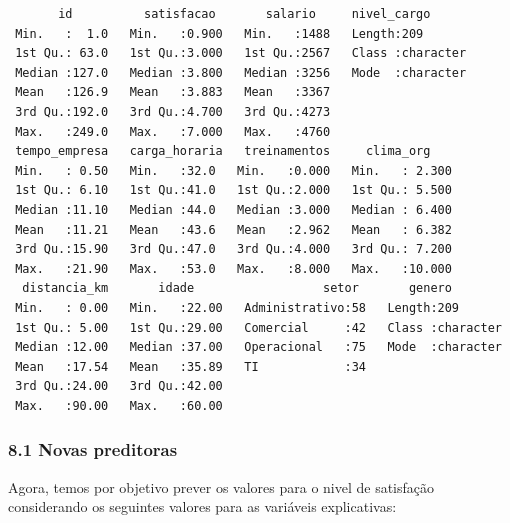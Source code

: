 \documentclass[
  letterpaper,
  DIV=11,
  numbers=noendperiod]{scrartcl}
\begin{document}
\begin{verbatim}
       id          satisfacao       salario     nivel_cargo       
 Min.   :  1.0   Min.   :0.900   Min.   :1488   Length:209        
 1st Qu.: 63.0   1st Qu.:3.000   1st Qu.:2567   Class :character  
 Median :127.0   Median :3.800   Median :3256   Mode  :character  
 Mean   :126.9   Mean   :3.883   Mean   :3367                     
 3rd Qu.:192.0   3rd Qu.:4.700   3rd Qu.:4273                     
 Max.   :249.0   Max.   :7.000   Max.   :4760                     
 tempo_empresa   carga_horaria   treinamentos     clima_org     
 Min.   : 0.50   Min.   :32.0   Min.   :0.000   Min.   : 2.300  
 1st Qu.: 6.10   1st Qu.:41.0   1st Qu.:2.000   1st Qu.: 5.500  
 Median :11.10   Median :44.0   Median :3.000   Median : 6.400  
 Mean   :11.21   Mean   :43.6   Mean   :2.962   Mean   : 6.382  
 3rd Qu.:15.90   3rd Qu.:47.0   3rd Qu.:4.000   3rd Qu.: 7.200  
 Max.   :21.90   Max.   :53.0   Max.   :8.000   Max.   :10.000  
  distancia_km       idade                  setor       genero         
 Min.   : 0.00   Min.   :22.00   Administrativo:58   Length:209        
 1st Qu.: 5.00   1st Qu.:29.00   Comercial     :42   Class :character  
 Median :12.00   Median :37.00   Operacional   :75   Mode  :character  
 Mean   :17.54   Mean   :35.89   TI            :34                     
 3rd Qu.:24.00   3rd Qu.:42.00                                         
 Max.   :90.00   Max.   :60.00                                         
\end{verbatim}

\subsubsection{8.1 Novas preditoras}\label{novas-preditoras}

Agora, temos por objetivo prever os valores para o nivel de satisfação
considerando os seguintes valores para as variáveis explicativas:
\end{document}
